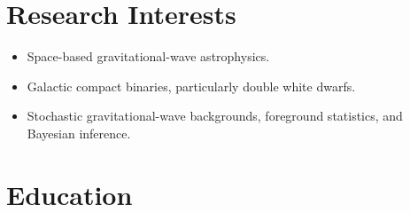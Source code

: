 \documentclass[letterpaper,11pt]{article}
\begin{document}
\par\vspace{12pt}


\section{Research Interests}

\begin{itemize}[
    leftmargin=0.38in,
    topsep=0pt,
    itemsep=3pt,
    parsep=0pt
]

    \item
    Space-based gravitational-wave astrophysics.

    \item
    Galactic compact binaries, particularly double white dwarfs.

    \item
    Stochastic gravitational-wave backgrounds,
    foreground statistics, and Bayesian inference.

\end{itemize}


\section{Education}
\end{document}
